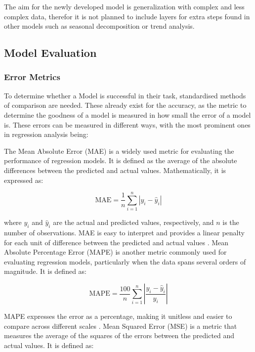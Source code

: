 \documentclass{article}
\begin{document}
The aim for the newly developed model is generalization with complex and less complex data, therefor it is not planned to include layers for extra steps found in other models such as seasonal decomposition or trend analysis.

\subsection{Model Evaluation}
\subsubsection{Error Metrics}

To determine whether a Model is successful in their task, standardised methods of comparison are needed. These already exist for the accuracy, as the metric to determine the goodness of a model is measured in how small the error of a model is. These errors can be measured in different ways, with the most prominent ones in regression analysis being:

The Mean Absolute Error (MAE) is a widely used metric for evaluating the performance of regression models. It is defined as the average of the absolute differences between the predicted and actual values. Mathematically, it is expressed as:

\begin{equation}
\text{MAE} = \frac{1}{n} \sum_{i=1}^{n} \left| y_i - \hat{y}_i \right|
\end{equation}

where \(y_i\) and \(\hat{y}_i\) are the actual and predicted values, respectively, and \(n\) is the number of observations. MAE is easy to interpret and provides a linear penalty for each unit of difference between the predicted and actual values \cite{MAE_RMSE}.
Mean Absolute Percentage Error (MAPE) is another metric commonly used for evaluating regression models, particularly when the data spans several orders of magnitude. It is defined as:

\begin{equation}
\text{MAPE} = \frac{100}{n} \sum_{i=1}^{n} \left| \frac{y_i - \hat{y}_i}{y_i} \right|
\end{equation}

MAPE expresses the error as a percentage, making it unitless and easier to compare across different scales \cite{MAPE}.
Mean Squared Error (MSE) is a metric that measures the average of the squares of the errors between the predicted and actual values. It is defined as:
\end{document}
